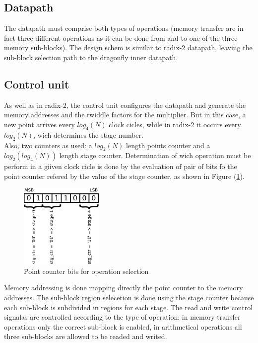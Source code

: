 \documentclass[conference]{IEEEtran}
\begin{document}
 \subsection{Datapath}
 
 The datapath must comprise both types of operations (memory transfer are in fact three different operations as it can be done from and to 
 one of the three memory sub-blocks). The design schem is similar to radix-2 datapath, leaving the sub-block selection path to the
 dragonfly inner datapath. 
 
 \subsection{Control unit}
 
 As well as in radix-2, the control unit configures the datapath and generate the memory addresses and the twiddle factors for
 the multiplier. But in this case, a new point arrives every $log_4(N)$ clock cicles, while in radix-2 it occurs every $log_2(N)$, 
 wich determines the stage number.\\
 Also, two counters as used: a $log_2(N)$ length points counter and a $log_2(log_4(N))$ length stage counter. Determination of wich operation
 must be perform in a giiven clock cicle is done by the evaluation of pair of bits fo the point counter refered by the value of 
 the stage counter, as shown in Figure (\ref{fig:r4conts}).
 
 \begin{figure}[htb!]
        \centering
        \includegraphics[width=4cm]{./figures/r4conts.png}
        \caption{Point counter bits for operation selection}
        \label{fig:r4conts}
\end{figure}   

Memory addressing is done mapping directly the point counter to the memory addresses. The sub-block region selecetion is done using the 
stage counter because each sub-block is subdivided in regions for each stage. The read and write control signalas are controlled according 
to the type of operation: in memory transfer operations only the correct sub-block is enabled, in arithmetical operations all three sub-blocks
are allowed to be readed and writed.
\end{document}
